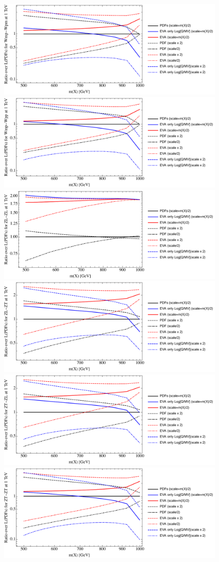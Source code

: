 \documentclass[a4paper,11pt]{article}
\begin{document}
\begin{figure}[ht]
\includegraphics[width=0.46\linewidth]{Notebooks/PlotLumi/1TeV/ratios/Wmp-Wpm.pdf}
\includegraphics[width=0.46\linewidth]{Notebooks/PlotLumi/1TeV/ratios/Wmp-Wpp.pdf}
\includegraphics[width=0.46\linewidth]{Notebooks/PlotLumi/1TeV/ratios/ZL-ZL.pdf}
\includegraphics[width=0.46\linewidth]{Notebooks/PlotLumi/1TeV/ratios/ZL-ZT.pdf}
\includegraphics[width=0.46\linewidth]{Notebooks/PlotLumi/1TeV/ratios/ZT-ZL.pdf}
\includegraphics[width=0.46\linewidth]{Notebooks/PlotLumi/1TeV/ratios/ZT-ZT.pdf}
\end{figure}
\end{document}
